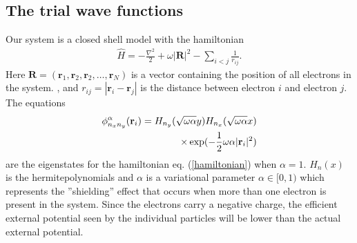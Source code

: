 \documentclass[a4paper,10pt,twocolumn]{article} %
\newcommand{\ts}[1]{\textbf{#1}}
\begin{document}
\subsection{The trial wave functions}%

Our system is a closed shell model with the hamiltonian 
\begin{align} 
	\hat H = -\frac{\nabla ^2}2 + \omega |\ts R|^2 - \sum_{i<j}\frac1{r_{ij}}.\label{hamiltonian}
\end{align}
Here $\ts R=(\ts r_1,\ts r_2, \ts r_2, \dots, \ts r_N)$ is a vector containing the position of all electrons in the system.
, and $r_{ij}=|\ts r_i-\ts r_j|$ is the distance between electron $i$ and electron $j$.
The equations
\begin{align}
	\phi_{n_xn_y}^\alpha(\ts r_i) = H_{n_y}(\sqrt{\omega\alpha}y)H_{n_x}(\sqrt{\omega\alpha}x)\notag\\
	\times \exp(-\frac12\omega\alpha|\ts r_i|^2) \label{1pts}
\end{align}
are the eigenstates for the hamiltonian eq. (\ref{hamiltonian}) when $\alpha=1$. $H_n(x)$ is the hermitepolynomials and $\alpha$ is a variational 
parameter $\alpha\in[0,1)$ which represents the ''shielding'' effect that occurs when more than one electron is present in the system. Since the 
electrons carry a negative charge, the efficient external potential seen by the individual particles will be lower than the actual external potential.
\end{document}

